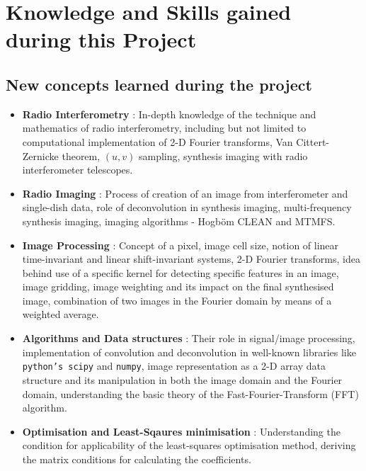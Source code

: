 \documentclass{article}
\begin{document}
\section{Knowledge and Skills gained during this Project}
\subsection{New concepts learned during the project}
\begin{itemize}
\item \textbf{Radio Interferometry} : In-depth knowledge of the technique and mathematics of radio interferometry, including but not limited to computational implementation of 2-D Fourier transforms, Van Cittert-Zernicke theorem, $(u,v)$ sampling, synthesis imaging with radio interferometer telescopes.
\item \textbf{Radio Imaging} : Process of creation of an image from interferometer and single-dish data, role of deconvolution in synthesis imaging, multi-frequency synthesis imaging, imaging algorithms - Hogb\"{o}m CLEAN and MTMFS. 
\item \textbf{Image Processing} : Concept of a pixel, image cell size, notion of linear time-invariant and linear shift-invariant systems, 2-D Fourier transforms, idea behind use of a specific kernel for detecting specific features in an image, image gridding, image weighting and its impact on the final synthesised image, combination of two images in the Fourier domain by means of a weighted average.
\item \textbf{Algorithms and Data structures} : Their role in signal/image processing, implementation of convolution and deconvolution in well-known libraries like \texttt{python's scipy} and  \texttt{numpy}, image representation as a 2-D array data structure and its manipulation in both the image domain and the Fourier domain, understanding the basic theory of the Fast-Fourier-Transform (FFT) algorithm.
\item \textbf{Optimisation and Least-Sqaures minimisation} : Understanding the condition for applicability of the least-squares optimisation method, deriving the matrix conditions for calculating the coefficients.
\end{itemize}
\end{document}
